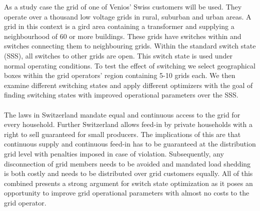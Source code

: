 

As a study case the grid of one of Venios' Swiss customers will be used. 
They operate over a thousand
low voltage grids in rural, suburban and urban areas\autocite{venios}. 
A grid in this context is a gird area containing a transformer and supplying
a neighbourhood of 60 or more buildings\autocite{venios}. These grids have switches
within and switches connecting them to neighbouring grids. Within the standard
switch state (SSS), all switches to other grids are open. This switch state is
used under normal operating conditions\autocite{venios}. To test the effect of switching
we select geographical boxes within the grid operators' region containing 5-10 grids each.
We then examine different switching states and apply different optimizers with the goal
of finding switching states with improved operational parameters over the SSS.\\
\\
The laws in Switzerland mandate equal and continuous access to the grid for every household.
Further Switzerland allows feed-in by private households with a right to sell guaranteed
for small producers\autocite{venios}. The implications of this are that continuous supply
and continuous feed-in has to be guaranteed at the distribution grid level with penalties
imposed in case of violation. Subsequently, any disconnection of grid members needs
to be avoided and mandated load shedding is both costly and needs to be distributed
over grid customers equally\autocite{venios}. All of this combined presents a strong
argument for switch state optimization as it poses an opportunity to improve grid operational
parameters with almost no costs to the grid operator.